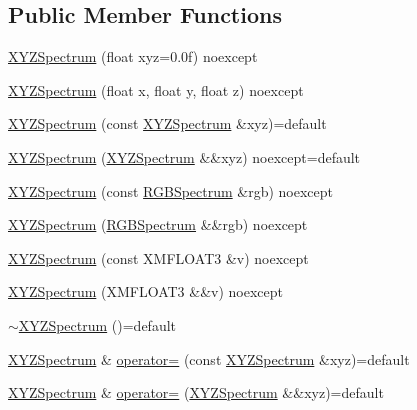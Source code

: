 \subsection*{Public Member Functions}
\begin{DoxyCompactItemize}
\item 
\hyperlink{structmage_1_1_x_y_z_spectrum_a8bb2d4458b86f430258f554b8f4ae9f2}{X\+Y\+Z\+Spectrum} (float xyz=0.\+0f) noexcept
\item 
\hyperlink{structmage_1_1_x_y_z_spectrum_a7e3d8b599655bf3ef54388a792eb4ace}{X\+Y\+Z\+Spectrum} (float x, float y, float z) noexcept
\item 
\hyperlink{structmage_1_1_x_y_z_spectrum_a009f032f53c57219b67f17fec022e2fb}{X\+Y\+Z\+Spectrum} (const \hyperlink{structmage_1_1_x_y_z_spectrum}{X\+Y\+Z\+Spectrum} \&xyz)=default
\item 
\hyperlink{structmage_1_1_x_y_z_spectrum_a17d10e71ad586928af9005b8b63edafc}{X\+Y\+Z\+Spectrum} (\hyperlink{structmage_1_1_x_y_z_spectrum}{X\+Y\+Z\+Spectrum} \&\&xyz) noexcept=default
\item 
\hyperlink{structmage_1_1_x_y_z_spectrum_a7498fec029d8e76e7b666116ac6f2cc8}{X\+Y\+Z\+Spectrum} (const \hyperlink{structmage_1_1_r_g_b_spectrum}{R\+G\+B\+Spectrum} \&rgb) noexcept
\item 
\hyperlink{structmage_1_1_x_y_z_spectrum_aeea123e6753c755aa594552bad15450b}{X\+Y\+Z\+Spectrum} (\hyperlink{structmage_1_1_r_g_b_spectrum}{R\+G\+B\+Spectrum} \&\&rgb) noexcept
\item 
\hyperlink{structmage_1_1_x_y_z_spectrum_a3a89ed028f199098a6b434fbc1daf943}{X\+Y\+Z\+Spectrum} (const X\+M\+F\+L\+O\+A\+T3 \&v) noexcept
\item 
\hyperlink{structmage_1_1_x_y_z_spectrum_a5e76024eef44618dda395bfc53393728}{X\+Y\+Z\+Spectrum} (X\+M\+F\+L\+O\+A\+T3 \&\&v) noexcept
\item 
\hyperlink{structmage_1_1_x_y_z_spectrum_af3a318ebdb1eb1e47cd81707850049a7}{$\sim$\+X\+Y\+Z\+Spectrum} ()=default
\item 
\hyperlink{structmage_1_1_x_y_z_spectrum}{X\+Y\+Z\+Spectrum} \& \hyperlink{structmage_1_1_x_y_z_spectrum_afb9ded2a6c69514b9853f753c5f94f98}{operator=} (const \hyperlink{structmage_1_1_x_y_z_spectrum}{X\+Y\+Z\+Spectrum} \&xyz)=default
\item 
\hyperlink{structmage_1_1_x_y_z_spectrum}{X\+Y\+Z\+Spectrum} \& \hyperlink{structmage_1_1_x_y_z_spectrum_a5191cffff5e1560164a34d43aa72441b}{operator=} (\hyperlink{structmage_1_1_x_y_z_spectrum}{X\+Y\+Z\+Spectrum} \&\&xyz)=default
\end{DoxyCompactItemize}


